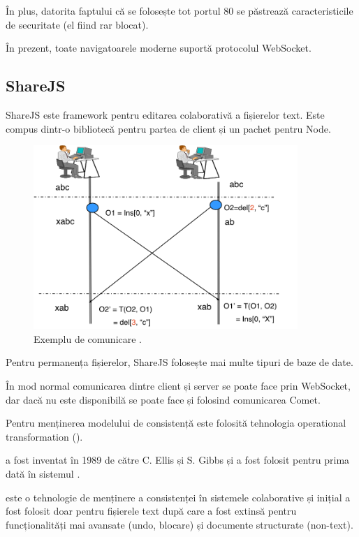 \documentclass[a4wide,12pt]{report}
\newcommand{\eng}[1]{{#1}} %
\newcommand{\acr}[1]{{\textsmaller[1]{\textsc{#1}}}} %
\begin{document}
În plus, datorita faptului că se folosește tot portul 80 se păstrează
caracteristicile de securitate (el fiind rar blocat).

În prezent, toate navigatoarele moderne suportă protocolul WebSocket.

\subsection{ShareJS}
\label{sharejssub}

ShareJS este \eng{framework} pentru editarea colaborativă a fișierelor text.
Este compus dintr-o bibliotecă pentru partea de client și un pachet pentru Node.

\begin{figure}[h!]
\begin{center}
\includegraphics[width=10cm]{imagini/ot}
\end{center}
\caption{Exemplu de comunicare \acr{OT}.\cite{otimage}}
\label{otfig}
\end{figure}

Pentru permanența fișierelor, ShareJS folosește mai multe tipuri de baze de
date.

În mod normal comunicarea dintre client și server se poate face prin WebSocket,
dar dacă nu este disponibilă se poate face și folosind comunicarea Comet.

Pentru menținerea modelului de consistență este folosită tehnologia operational
transformation (\acr{OT}).

\acr{OT} a fost inventat în 1989 de către C. Ellis și S. Gibbs și a fost folosit
pentru prima dată în sistemul \acr{GROVE}\cite{concont}.

\acr{OT} este o tehnologie de menținere a consistenței în sistemele colaborative
și inițial a fost folosit doar pentru fișierele text după care a fost extinsă
pentru funcționalități mai avansate (\eng{undo}, blocare) și documente
structurate (non-text).
\end{document}
